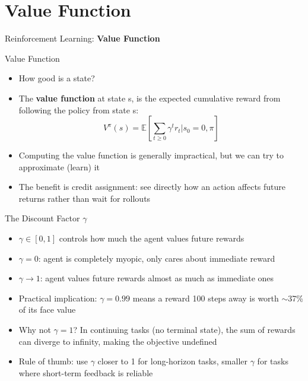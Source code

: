 \section{Value Function}
\begin{frame}{}
    \LARGE Reinforcement Learning: \textbf{Value Function}
\end{frame}

\begin{frame}{Value Function}
\begin{itemize}
    \item How good is a state?
    \pause
    \item The \textbf{value function} at state s, is the expected cumulative reward from following the policy from state s:
    $$V^{\pi}(s) = \mathbb{E} \left [ \sum_{t \geq 0} \gamma^t r_t | s_0=0, \pi \right ]$$
    \item Computing the value function is generally impractical, but we can try
to approximate (learn) it
    \item The benefit is credit assignment: see directly how an action affects
future returns rather than wait for rollouts

\end{itemize}

\end{frame}

\begin{frame}{The Discount Factor $\gamma$}
\begin{itemize}
    \item $\gamma \in [0,1]$ controls how much the agent values future rewards
    \item $\gamma = 0$: agent is completely myopic, only cares about immediate reward
    \item $\gamma \rightarrow 1$: agent values future rewards almost as much as immediate ones
    \item Practical implication: $\gamma = 0.99$ means a reward 100 steps away is worth $\sim$37\% of its face value
    \item Why not $\gamma = 1$? In continuing tasks (no terminal state), the sum of rewards can diverge to infinity, making the objective undefined
    \item Rule of thumb: use $\gamma$ closer to 1 for long-horizon tasks, smaller $\gamma$ for tasks where short-term feedback is reliable
\end{itemize}
\end{frame}

